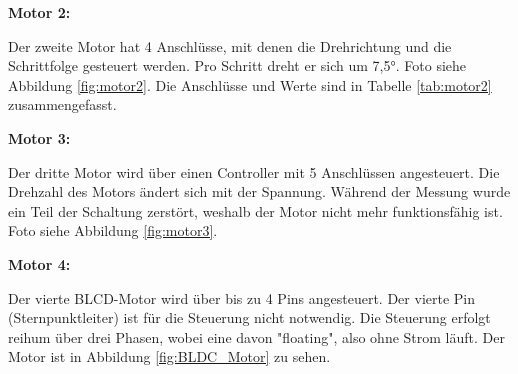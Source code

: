 \documentclass[a4paper,twoside,12pt,DIV=13,BCOR=5mm,numbers=noenddot,cleardoublepage=empty]{scrbook}
\begin{document}

\textbf{Motor 2:}

Der zweite Motor hat 4 Anschlüsse, mit denen die Drehrichtung und die Schrittfolge gesteuert werden. Pro Schritt dreht er sich um 7,5°.
Foto siehe Abbildung \ref{fig:motor2}. Die Anschlüsse und Werte sind in Tabelle \ref{tab:motor2} zusammengefasst.


\textbf{Motor 3:}

Der dritte Motor wird über einen Controller mit 5 Anschlüssen angesteuert. Die Drehzahl des Motors ändert sich mit der Spannung.
Während der Messung wurde ein Teil der Schaltung zerstört, weshalb der Motor nicht mehr funktionsfähig ist. Foto siehe Abbildung \ref{fig:motor3}.



\textbf{Motor 4:}

Der vierte BLCD-Motor wird über bis zu 4 Pins angesteuert. Der vierte Pin (Sternpunktleiter) ist für die Steuerung nicht notwendig.
Die Steuerung erfolgt reihum über drei Phasen, wobei eine davon "floating", also ohne Strom läuft.
Der Motor ist in Abbildung \ref{fig:BLDC_Motor} zu sehen.

\end{document}

